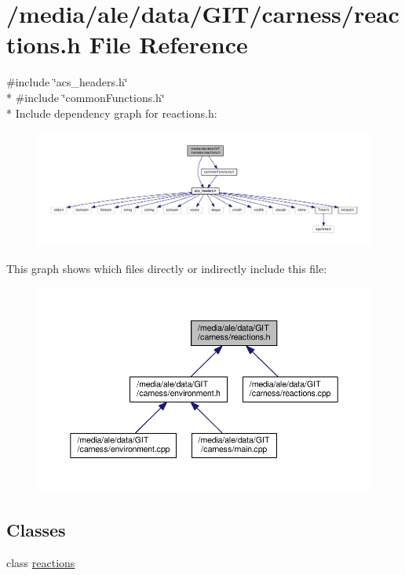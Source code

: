 \hypertarget{a00085}{\section{/media/ale/data/\-G\-I\-T/carness/reactions.h File Reference}
\label{a00085}
}
{\ttfamily \#include \char`\"{}acs\-\_\-headers.\-h\char`\"{}}\\*
{\ttfamily \#include \char`\"{}common\-Functions.\-h\char`\"{}}\\*
Include dependency graph for reactions.\-h\-:\nopagebreak
\begin{figure}[H]
\begin{center}
\leavevmode
\includegraphics[width=350pt]{a00158}
\end{center}
\end{figure}
This graph shows which files directly or indirectly include this file\-:\nopagebreak
\begin{figure}[H]
\begin{center}
\leavevmode
\includegraphics[width=350pt]{a00159}
\end{center}
\end{figure}
\subsection*{Classes}
\begin{DoxyCompactItemize}
\item 
class \hyperlink{a00013}{reactions}
\end{DoxyCompactItemize}
